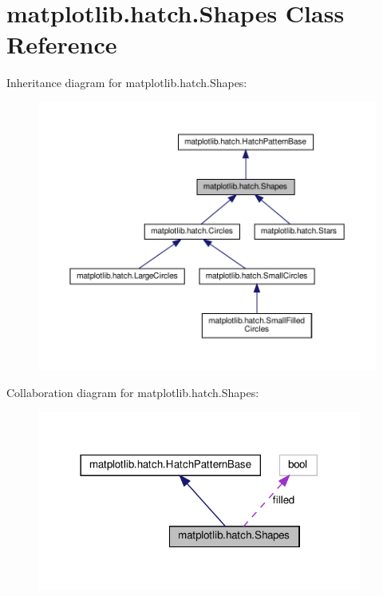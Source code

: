 \hypertarget{classmatplotlib_1_1hatch_1_1Shapes}{}\section{matplotlib.\+hatch.\+Shapes Class Reference}
\label{classmatplotlib_1_1hatch_1_1Shapes}


Inheritance diagram for matplotlib.\+hatch.\+Shapes\+:
\nopagebreak
\begin{figure}[H]
\begin{center}
\leavevmode
\includegraphics[width=350pt]{classmatplotlib_1_1hatch_1_1Shapes__inherit__graph}
\end{center}
\end{figure}


Collaboration diagram for matplotlib.\+hatch.\+Shapes\+:
\nopagebreak
\begin{figure}[H]
\begin{center}
\leavevmode
\includegraphics[width=302pt]{classmatplotlib_1_1hatch_1_1Shapes__coll__graph}
\end{center}
\end{figure}
